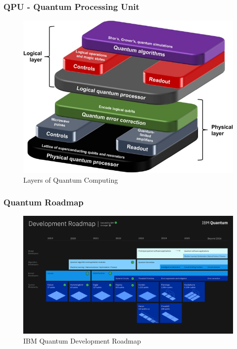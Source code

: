 \documentclass[xcolor=x11names,table]{beamer}
\begin{document}
	\begin{frame}
		\frametitle{QPU - Quantum Processing Unit}
		\begin{figure}[p]
			\centering
			\includegraphics[width=\linewidth,height=0.8\textheight,keepaspectratio]{refs/quantum_layers.jpg}
			\caption{Layers of Quantum Computing}
			\label{fig:qpu-architecture-nvidia-qoda}
		\end{figure}
	\end{frame}


	\begin{frame}[allowframebreaks]
		\frametitle{Quantum Roadmap}
		\begin{figure}[p]
			\centering
			\includegraphics[width=\linewidth,height=0.7\textheight,keepaspectratio]{refs/ibm-quantum-development-roadmap.png}
			\caption{IBM Quantum Development Roadmap}
			\label{fig:ibm-quantum-roadmap}
		\end{figure}
	\end{frame}
\end{document}
